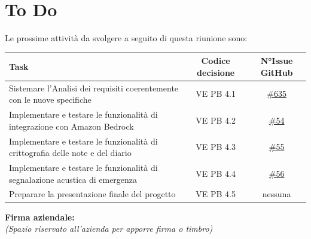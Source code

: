 \documentclass[a4paper,12pt]{article}
\newcommand{\ignoreglossary}{}
\begin{document}
\section{To Do}
Le prossime attività da svolgere a seguito di questa riunione sono:
\begin{center}
\small
\renewcommand{\arraystretch}{1.2} 
\begin{tabularx}{\textwidth}{|X|c|c|}
\hline
\rowcolor{gray!60} 
\textbf{Task} & \textbf{Codice decisione} & \textbf{N°Issue GitHub} \\
\hline
Sistemare l'Analisi dei requisiti coerentemente con le nuove specifiche & VE \ignoreglossary{PB} 4.1 & \href{https://github.com/SWE-BitByBit/SWE-docs/issues/635}{\#635} \\
\hline
Implementare e testare le funzionalità di integrazione con Amazon Bedrock & VE \ignoreglossary{PB} 4.2 & \href{https://github.com/SWE-BitByBit/Project-MVP/issues/54}{\#54} \\
\hline
Implementare e testare le funzionalità di crittografia delle note e del diario & VE \ignoreglossary{PB} 4.3 & \href{https://github.com/SWE-BitByBit/Project-MVP/issues/55}{\#55} \\
\hline
Implementare e testare le funzionalità di segnalazione acustica di emergenza & VE \ignoreglossary{PB} 4.4 & \href{https://github.com/SWE-BitByBit/Project-MVP/issues/56}{\#56} \\
\hline
Preparare la presentazione finale del progetto & VE \ignoreglossary{PB} 4.5 & nessuna \\
\hline
\end{tabularx}
\end{center}

\vspace*{\fill}
\noindent
\begin{minipage}{0.60\textwidth}
    {\small
    \textbf{Firma aziendale:}\\[0.3cm]
    \textit{(Spazio riservato all’azienda per apporre firma o timbro)}\\[0.8cm]
    \fbox{\rule{0pt}{2.5cm}\rule{5cm}{0pt}} 
    }
\end{minipage}
\end{document}
